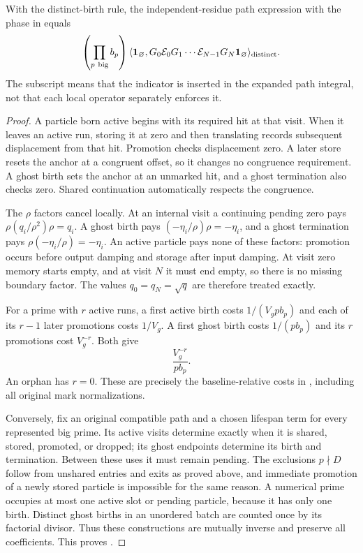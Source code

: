 \begin{lemma}\label{lem:memory-identity}
With the distinct-birth rule, the independent-residue path
expression with the phase in  equals
\begin{equation}\label{eq:memory-product}
 \left(\prod_{p\ \text{big}}b_p\right)
 \langle\mathbf1_\varnothing,
       G_0\mathcal E_0G_1\cdots\mathcal E_{N-1}G_N
       \mathbf1_\varnothing\rangle_{\rm distinct}.
\end{equation}
The subscript means that the indicator is inserted in the
expanded path integral, not that each local operator separately
enforces it.
\end{lemma}

\begin{proof}
A particle born active begins with its required hit at that
visit.  When it leaves an active run, storing it at zero and
then translating records subsequent displacement from that
hit.  Promotion checks displacement zero.  A later store
resets the anchor at a congruent offset, so it changes no
congruence requirement.  A ghost birth sets the anchor at an
unmarked hit, and a ghost termination also checks zero.
Shared continuation automatically respects the congruence.

The $\rho$ factors cancel locally.  At an internal visit a
continuing pending zero pays
$\rho(q_i/\rho^2)\rho=q_i$.  A ghost birth pays
$(-\eta_i/\rho)\rho=-\eta_i$, and a ghost termination pays
$\rho(-\eta_i/\rho)=-\eta_i$.  An active particle pays none
of these factors: promotion occurs before output damping and
storage after input damping.  At visit zero memory starts
empty, and at visit $N$ it must end empty, so there is no
missing boundary factor.  The values $q_0=q_N=\sqrt q$ are
therefore treated exactly.

For a prime with $r$ active runs, a first active birth costs
$1/(V_gpb_p)$ and each of its $r-1$ later promotions costs
$1/V_g$.  A first ghost birth costs $1/(pb_p)$ and its $r$
promotions cost $V_g^{-r}$.  Both give
\[
 \frac{V_g^{-r}}{pb_p}.
\]
An orphan has $r=0$.  These are precisely the baseline-relative
costs in ,
including all original mark normalizations.

Conversely, fix an original compatible path and a chosen
lifespan term for every represented big prime.  Its active
visits determine exactly when it is shared, stored, promoted,
or dropped; its ghost endpoints determine its birth and
termination.  Between these uses it must remain pending.
The exclusions $p\nmid D$ follow from unshared entries and
exits as proved above, and immediate promotion of a newly
stored particle is impossible for the same reason.  A numerical
prime occupies at most one active slot or pending particle,
because it has only one birth.  Distinct ghost births in an
unordered batch are counted once by its factorial divisor.
Thus these constructions are mutually inverse and preserve
all coefficients.  This proves .
\end{proof}

